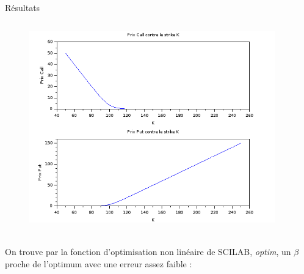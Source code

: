 \documentclass[final]{beamer}
\newlength{\onecolwid}
\newlength{\twocolwid}
\begin{document}
\begin{frame}[t]
\begin{columns}[t]
\begin{column}{\twocolwid}
\begin{block}{Résultats}
\begin{columns}[t,totalwidth=0.45\paperwidth]
\begin{column}{\onecolwid}
\begin{minipage}{1.49\textwidth}
\begin{figure}[!r]
  \vspace{-10cm}
  \hspace{-4cm}
  \includegraphics[scale=0.8]{callput.png}
\end{figure}
\end{minipage}
\newline
\newline
\\
  On trouve par la fonction d'optimisation non linéaire de SCILAB, \textit{optim}, un $\beta$ proche de l'optimum avec une erreur assez faible :

\end{column} %

\begin{column}{\onecolwid} %




\end{column}
\end{columns}
\end{block}
\end{column}
\end{columns}
\end{frame}
\end{document}
